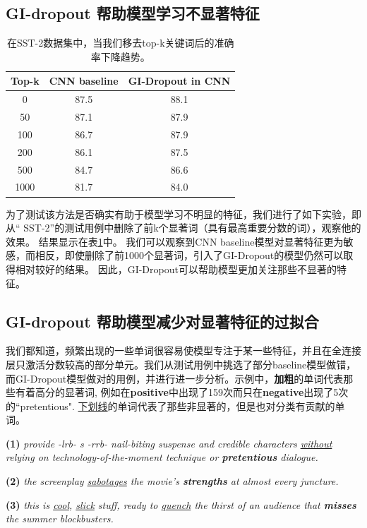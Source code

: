 \subsection{GI-dropout 帮助模型学习不显著特征}
\begin{table}[!t]
\centering
\begin{tabular}{c | c c}
\hline
\bfseries Top-k &  CNN baseline &  GI-Dropout in CNN\\
\hline
0 & 87.5 & 88.1  \\
50 & 87.1 & 87.9  \\
100 & 86.7 & 87.9  \\
200 & 86.1 & 87.5  \\
500 & 84.7 & 86.6  \\
1000 & 81.7 & 84.0 \\

\hline
\hline
\end{tabular}
\caption{在SST-2数据集中，当我们移去top-k关键词后的准确率下降趋势。}
\label{table: decline-SST-2}
\end{table}
为了测试该方法是否确实有助于模型学习不明显的特征，我们进行了如下实验，即从“ SST-2”的测试用例中删除了前k个显著词（具有最高重要分数的词），观察他的效果。
结果显示在表\ref{table: decline-SST-2}中。
我们可以观察到CNN baseline模型对显著特征更为敏感，而相反，即使删除了前1000个显著词，引入了GI-Dropout的模型仍然可以取得相对较好的结果。
因此，GI-Dropout可以帮助模型更加关注那些不显著的特征。


\subsection{GI-dropout 帮助模型减少对显著特征的过拟合}
我们都知道，频繁出现的一些单词很容易使模型专注于某一些特征，并且在全连接层只激活分数较高的部分单元。我们从测试用例中挑选了部分baseline模型做错，而GI-Dropout模型做对的用例，并进行进一步分析。示例中，\textbf{加粗}的单词代表那些有着高分的显著词, 例如在\textbf{positive}中出现了159次而只在\textbf{negative}出现了5次的``pretentious". \underline{下划线}的单词代表了那些非显著的，但是也对分类有贡献的单词。 

\textbf{(1)}  \textit{provide -lrb- s -rrb- nail-biting suspense and credible characters \underline{without} relying on technology-of-the-moment technique or \textbf{pretentious} dialogue.}

\textbf{(2)}  \textit{the screenplay \underline{sabotages} the movie's \textbf{strengths} at almost every juncture.} 

\textbf{(3)}  \textit{this is \underline{cool}, \underline{slick} stuff, ready to \underline{quench} the thirst of an audience that \textbf{misses} the summer blockbusters.} 

